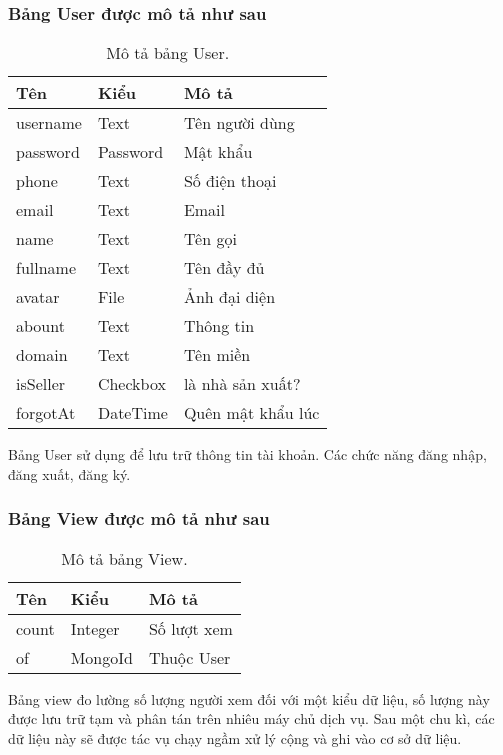 \subsubsection{Bảng User được mô tả như sau}
\begin{table}[!htbp]\fontsize{13px}{13px}\selectfont\justifying
\begin{center}
\caption{Mô tả bảng User.}
\begin{tabularx}{0.6\textwidth}{ |l|l|X| } 
\hline
Tên & Kiểu & Mô tả \\
\hline
username & Text & Tên người dùng \\
password & Password & Mật khẩu \\
phone & Text & Số điện thoại \\
email & Text & Email \\
name & Text & Tên gọi \\
fullname & Text & Tên đầy đủ \\
avatar & File & Ảnh đại diện \\
abount & Text & Thông tin \\
domain & Text & Tên miền \\
isSeller & Checkbox & là nhà sản xuất? \\
forgotAt & DateTime & Quên mật khẩu lúc \\ 
\hline
\end{tabularx}
\label{table:User}
\end{center}
Bảng User sử dụng để lưu trữ thông tin tài khoản. Các chức năng đăng nhập, đăng xuất, đăng ký.
\end{table}

\subsubsection{Bảng View được mô tả như sau}
\begin{table}[!htbp]\fontsize{13px}{13px}\selectfont\justifying
\begin{center}
\caption{Mô tả bảng View.}
\begin{tabularx}{0.6\textwidth}{ |l|l|X| } 
\hline
Tên & Kiểu & Mô tả \\
\hline
count & Integer & Số lượt xem \\
of & MongoId & Thuộc User \\ 
\hline
\end{tabularx}
\label{table:View}
\end{center}
Bảng view đo lường số lượng người xem đối với một kiểu dữ liệu, số lượng này được lưu trữ tạm và phân tán trên nhiêu máy chủ dịch vụ. Sau một chu kì, các dữ liệu này sẽ được tác vụ chạy ngầm xử lý cộng và ghi vào cơ sở dữ liệu.
\end{table}
\clearpage
